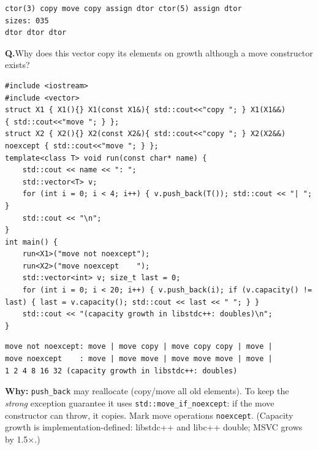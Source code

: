 \documentclass[10pt,a4paper,openany,oneside]{report}
\newcounter{qcount}
\newenvironment{qn}{\par\medskip\Needspace*{4\baselineskip}\refstepcounter{qcount}\noindent\textbf{\color{qviolet}Q\thechapter.\arabic{qcount}}\hspace{4pt}}{\par}
\begin{document}
\begin{lstlisting}[style=out,title={Answer: captured output}]
ctor(3) copy move copy assign dtor ctor(5) assign dtor 
sizes: 035
dtor dtor dtor 
\end{lstlisting}
\begin{qn}Why does this vector copy its elements on growth although a move constructor exists?\end{qn}
\begin{lstlisting}[language={[11]C++},title={vector reallocation: move vs copy (and capacity growth)}]
#include <iostream>
#include <vector>
struct X1 { X1(){} X1(const X1&){ std::cout<<"copy "; } X1(X1&&)          { std::cout<<"move "; } };
struct X2 { X2(){} X2(const X2&){ std::cout<<"copy "; } X2(X2&&) noexcept { std::cout<<"move "; } };
template<class T> void run(const char* name) {
    std::cout << name << ": ";
    std::vector<T> v;
    for (int i = 0; i < 4; i++) { v.push_back(T()); std::cout << "| "; }
    std::cout << "\n";
}
int main() {
    run<X1>("move not noexcept");
    run<X2>("move noexcept    ");
    std::vector<int> v; size_t last = 0;
    for (int i = 0; i < 20; i++) { v.push_back(i); if (v.capacity() != last) { last = v.capacity(); std::cout << last << " "; } }
    std::cout << "(capacity growth in libstdc++: doubles)\n";
}
\end{lstlisting}
\begin{lstlisting}[style=out,title={Answer: captured output}]
move not noexcept: move | move copy | move copy copy | move | 
move noexcept    : move | move move | move move move | move | 
1 2 4 8 16 32 (capacity growth in libstdc++: doubles)
\end{lstlisting}
\textbf{Why:} \texttt{push\_back} may reallocate (copy/move all old elements). To keep the \emph{strong} exception guarantee it uses \texttt{std::move\_if\_noexcept}: if the move constructor can throw, it copies. Mark move operations \texttt{noexcept}. (Capacity growth is implementation-defined: libstdc++ and libc++ double; MSVC grows by 1.5$\times$.)
\end{document}
